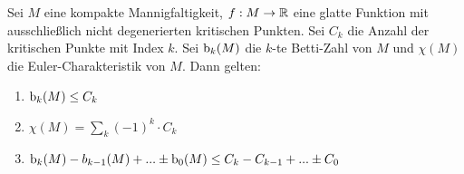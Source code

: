 \begin{theorem}
    Sei $M$ eine kompakte Mannigfaltigkeit, $f: M \to { \mathbb R }$ eine glatte Funktion
    mit ausschließlich nicht degenerierten kritischen Punkten. Sei $C_k$ die
    Anzahl der kritischen Punkte mit Index $k$. Sei ${ \operatorname{b} }_k(M)$ die $k$-te 
    Betti-Zahl von $M$ und $\chi(M)$ die Euler-Charakteristik von $M$. 
    Dann gelten:
    \begin{enumerate}
        \item $ { \operatorname{b} }_k(M) \leq C_k $ 
        \item $ \chi(M) = \sum_k (-1)^k \cdot C_k $
        \item $ { \operatorname{b} }_k(M) - b_{k - 1}(M) + ... \pm { \operatorname{b} }_0(M) 
            \leq C_k - C_{k-1} + ... \pm C_0 $
    \end{enumerate}
\end{theorem}


